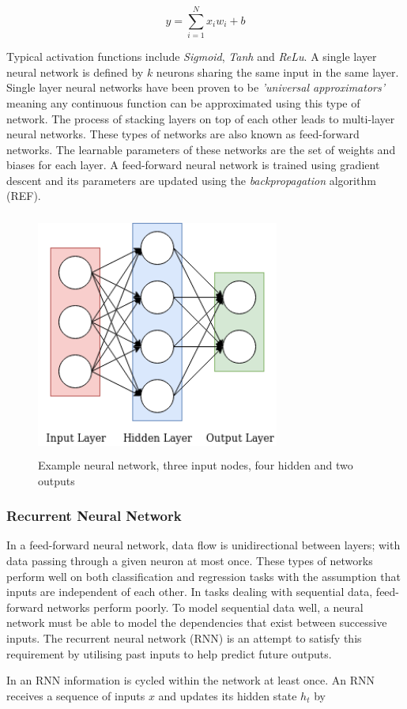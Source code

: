 \begin{equation}
	y = \sum_{i=1}^{N} x_{i}w_{i} + b
\end{equation}

\noindent
\newline
Typical activation functions include \textit{Sigmoid}, \textit{Tanh} and \textit{ReLu}. A single layer neural network is defined by \(k\) neurons sharing the same input in the same layer. Single layer neural networks have been proven to be \textit{'universal approximators'} meaning any continuous function can be approximated using this type of network. The process of stacking layers on top of each other leads to multi-layer neural networks. These types of networks are also known as feed-forward networks. The learnable parameters of these networks are the set of weights and biases for each layer. A feed-forward neural network is trained using gradient descent and its parameters are updated using the \textit{backpropagation} algorithm (REF).

\begin{figure}[h]
	\includegraphics[width=8cm, height=8cm]{./figures/fig2}
	\centering
	\caption{Example neural network, three input nodes, four hidden and two outputs}
	\label{fig:fig2}
\end{figure}

\subsubsection{Recurrent Neural Network}
In a feed-forward neural network, data flow is unidirectional between layers; with data passing through a given neuron at most once. These types of networks perform well on both classification and regression tasks with the assumption that inputs are independent of each other. In tasks dealing with sequential data, feed-forward networks perform poorly. To model sequential data well, a neural network must be able to model the dependencies that exist between successive inputs. The recurrent neural network (RNN) is an attempt to satisfy this requirement by utilising past inputs to help predict future outputs.
\par
\noindent
\newline
In an RNN information is cycled within the network at least once.  An RNN receives a sequence of inputs \(x\) and updates its hidden state \(h_{t}\) by 

